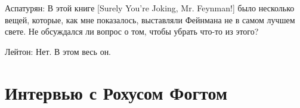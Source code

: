 \documentclass[11pt,oneside]{article}
\begin{document}
Аспатурян: В этой книге [Surely You’re Joking, Mr. Feynman!] было несколько вещей, которые, как мне показалось, выставляли Фейнмана не в самом лучшем свете. Не обсуждался ли вопрос о том, чтобы убрать что-то из этого?\par



Лейтон: Нет. В этом весь он.\par



\clearpage


\section*{Интервью с Рохусом Фогтом}



\label{tips-sec-8-интервью-с-рохусом-фогтом}

\end{document}
